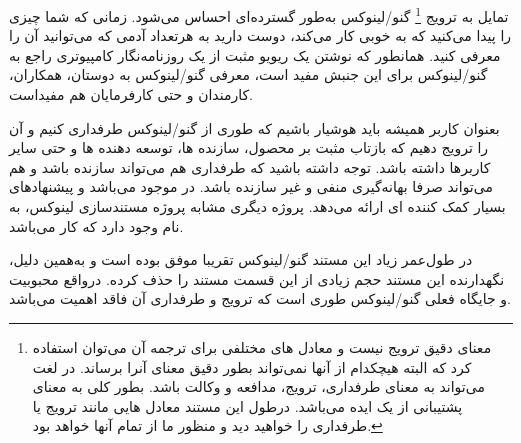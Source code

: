تمایل به ترویج 
\footnote{
معنای دقیق  ترویج نیست و
معادل های مختلفی برای ترجمه آن می‌توان استفاده کرد که البته
هیچکدام از آنها نمی‌تواند بطور دقیق معنای آنرا برساند. 
در لغت می‌تواند به معنای طرفداری، ترویج، مدافعه و وکالت باشد.
بطور کلی  به معنای پشتیبانی از یک ایده می‌باشد.
درطول این مستند معادل هایی مانند ترویج یا طرفداری را خواهید دید
و منظور ما از تمام آنها  خواهد بود.
}
گنو/لینوکس به‌طور گسترده‌ای احساس می‌شود.
زمانی که شما چیزی را پیدا می‌کنید که به خوبی کار می‌کند،
دوست دارید به هرتعداد آدمی که می‌توانید آن را معرفی کنید.
همانطور که نوشتن یک ریویو مثبت از یک روزنامه‌نگار کامپیوتری
راجع به گنو/لینوکس برای این جنبش مفید است، معرفی گنو/لینوکس
به دوستان، همکاران، کارمندان و حتی کارفرمایان هم مفیداست.

بعنوان کاربر همیشه باید هوشیار باشیم که طوری از گنو/لینوکس
طرفداری کنیم و آن را ترویج دهیم که بازتاب مثبت بر محصول،
سازنده ها، توسعه دهنده ها و حتی سایر کاربرها داشته باشد.
توجه داشته باشید که طرفداری هم می‌تواند سازنده باشد و هم می‌تواند
صرفا بهانه‌گیری منفی و غیر سازنده باشد.
در
موجود می‌باشد و پیشنهادهای بسیار کمک کننده ای ارائه می‌دهد.
پروژه دیگری مشابه پروژه مستندسازی لینوکس، به نام 
وجود دارد که کار  می‌باشد.



در طول‌عمر زیاد این مستند گنو/لینوکس تقریبا موفق بوده است و به‌همین دلیل،
نگهدارنده این مستند حجم زیادی از این قسمت مستند را حذف کرده. درواقع
محبوبیت و جایگاه فعلی گنو/لینوکس طوری است که ترویج و طرفداری آن فاقد اهمیت می‌باشد.

